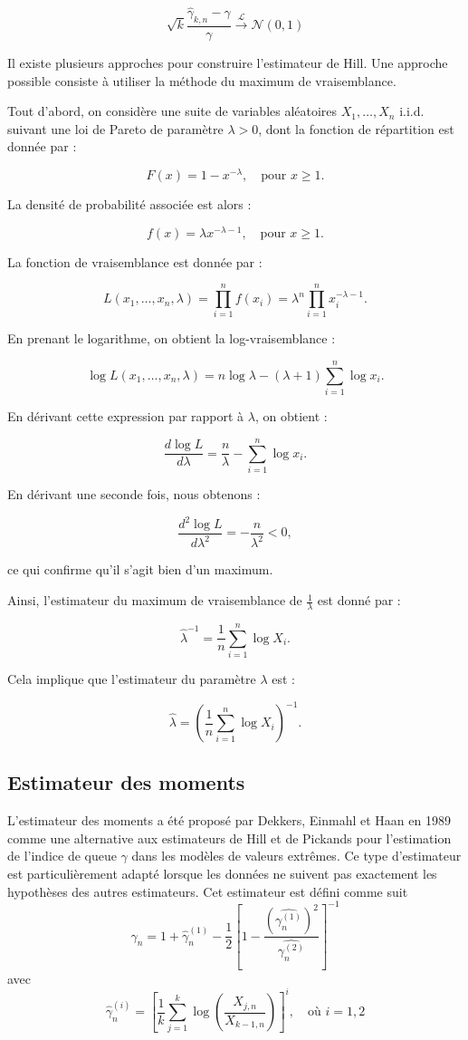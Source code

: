 \documentclass{article}
\begin{document}
\[
\sqrt{k} \frac{\hat{\gamma}_{k,n} - \gamma}{\gamma} \xrightarrow{\mathcal{L}} \mathcal{N}(0,1)
\]

Il existe plusieurs approches pour construire l'estimateur de Hill. Une approche possible consiste à utiliser la méthode du maximum de vraisemblance. 

Tout d'abord, on considère une suite de variables aléatoires \( X_1, \dots, X_n \) i.i.d. suivant une loi de Pareto de paramètre \( \lambda > 0 \), dont la fonction de répartition est donnée par :  

\[
F(x) = 1 - x^{-\lambda}, \quad \text{pour } x \geq 1.
\]

La densité de probabilité associée est alors :

\[
f(x) = \lambda x^{-\lambda - 1}, \quad \text{pour } x \geq 1.
\]

La fonction de vraisemblance est donnée par :

\[
L(x_1, \dots, x_n, \lambda) = \prod_{i=1}^{n} f(x_i) = \lambda^{n} \prod_{i=1}^{n} x_i^{-\lambda - 1}.
\]

En prenant le logarithme, on obtient la log-vraisemblance :

\[
\log L(x_1, \dots, x_n, \lambda) = n \log \lambda - (\lambda + 1) \sum_{i=1}^{n} \log x_i.
\]

En dérivant cette expression par rapport à \( \lambda \), on obtient :

\[
\frac{d \log L}{d \lambda} = \frac{n}{\lambda} - \sum_{i=1}^{n} \log x_i.
\]

En dérivant une seconde fois, nous obtenons :

\[
\frac{d^2 \log L}{d \lambda^2} = -\frac{n}{\lambda^2} < 0,
\]

ce qui confirme qu'il s'agit bien d'un maximum.  

Ainsi, l'estimateur du maximum de vraisemblance de \( \frac{1}{\lambda} \) est donné par :

\[
\hat{\lambda}^{-1} = \frac{1}{n} \sum_{i=1}^{n} \log X_i.
\]

Cela implique que l'estimateur du paramètre \( \lambda \) est :

\[
\hat{\lambda} = \left( \frac{1}{n} \sum_{i=1}^{n} \log X_i \right)^{-1}.
\]

\subsection{Estimateur des moments}
L'estimateur des moments a été proposé par Dekkers, Einmahl et Haan en 1989 comme une alternative aux estimateurs de Hill et de Pickands pour l'estimation de l'indice de queue \(\gamma\) dans les modèles de valeurs extrêmes. Ce type d'estimateur est particulièrement adapté lorsque les données ne suivent pas exactement les hypothèses des autres estimateurs. Cet estimateur est défini comme suit 
\[
\hat{\gamma}_{n} = 1 + \hat{\gamma}_{n}^{(1)} - \frac{1}{2}[1 - \frac{(\hat{\gamma_{n}^{(1)}})^2}{\hat{\gamma_{n}^{(2)}}}]^{-1}
\]
avec 
\[
\hat{\gamma}_{n}^{(i)} = \left[ \frac{1}{k} \sum_{j = 1}^{k} \log\left(\frac{X_{j,n}}{X_{k-1,n}}\right) \right]^i, \quad \text{où } i = 1,2
\]
\end{document}

